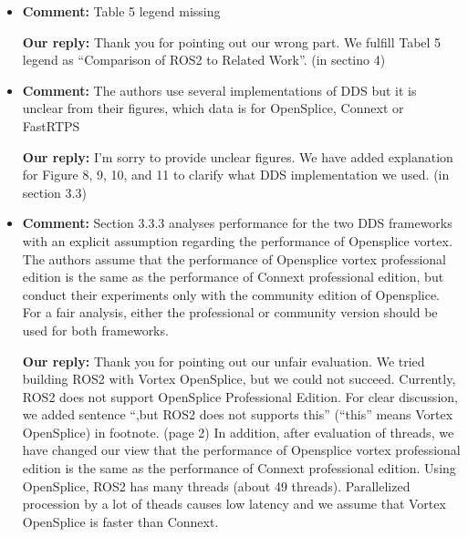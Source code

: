 \documentclass{article}
\begin{document}
\begin{itemize}
\item \begin{flushleft}
    \textbf{Comment:} Table 5 legend missing
  \end{flushleft}

  \begin{flushleft}
    \textbf{Our reply:} Thank you for pointing out our wrong part. We fulfill Tabel 5 legend as ``Comparison of ROS2 to Related Work''. (in sectino 4)
  \end{flushleft}


\item \begin{flushleft}
    \textbf{Comment:} The authors use several implementations of DDS but it is unclear from their figures, which data is for OpenSplice, Connext or FastRTPS
  \end{flushleft}

  \begin{flushleft}
    \textbf{Our reply:} I'm sorry to provide unclear figures. We have added explanation for Figure 8, 9, 10, and 11 to clarify what DDS implementation we used. (in section 3.3)
  \end{flushleft}


\item \begin{flushleft}
    \textbf{Comment:} Section 3.3.3 analyses performance for the two DDS frameworks with an explicit assumption regarding the performance of Opensplice vortex. The authors assume that the performance of Opensplice vortex professional edition is the same as the performance of Connext professional edition, but conduct their experiments only with the community edition of Opensplice. For a fair analysis, either the professional or community version should be used for both frameworks.
  \end{flushleft}

  \begin{flushleft}
    \textbf{Our reply:} Thank you for pointing out our unfair evaluation. 
    We tried building ROS2 with Vortex OpenSplice, but we could not succeed. 
    Currently, ROS2 does not support OpenSplice Professional Edition. For clear discussion, we added sentence ``,but ROS2 does not supports this'' (``this'' means Vortex OpenSplice) in footnote. (page 2) 
    In addition, after evaluation of threads, we have changed our view that the performance of Opensplice vortex professional edition is the same as the performance of Connext professional edition. 
    Using OpenSplice, ROS2 has many threads (about 49 threads). 
    Parallelized procession by a lot of theads causes low latency and we assume that Vortex OpenSplice is faster than Connext.
  \end{flushleft}

\end{itemize}
\end{document}
